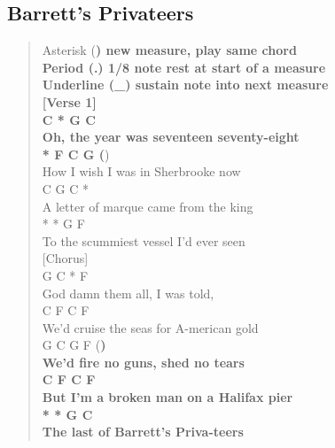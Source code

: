 \documentclass[11pt]{article}
\begin{document}
\subsection{Barrett's Privateers}
\label{sec:orgcea8a4f}
\begin{verse}
Asterisk  (\textbf{)  new measure, play same chord\\
Period    (.)  1/8 note rest at start of a measure\\
Underline (\_)  sustain note into next measure\\
\vspace*{1em}
[Verse 1]\\
\hspace*{8em}C        *         G       C\\
Oh, the year was seventeen seventy-eight\\
\hspace*{6em}*      F      C          G     (})\\
How I wish I was in Sherbrooke now\\
\hspace*{2em}C         G           C        *\\
A letter of marque came from the king\\
\hspace*{7em}*         *          G    F\\
To the scummiest vessel I'd ever seen\\
\vspace*{1em}
[Chorus]\\
\hspace*{4em}G         C    *     F\\
God damn them all, I was told,\\
\hspace*{5em}C          F          C       F\\
We'd cruise the seas for A-merican gold\\
\hspace*{5em}G       C     G       F     (\textbf{)\\
We'd fire no guns, shed no tears\\
\hspace*{10em}C      F        C       F\\
But I'm a broken man on a Halifax pier\\
\hspace*{4em}*       *         G     C\\
The last of Barrett's Priva-teers\\
\vspace*{1em}
}
\end{verse}
\end{document}
